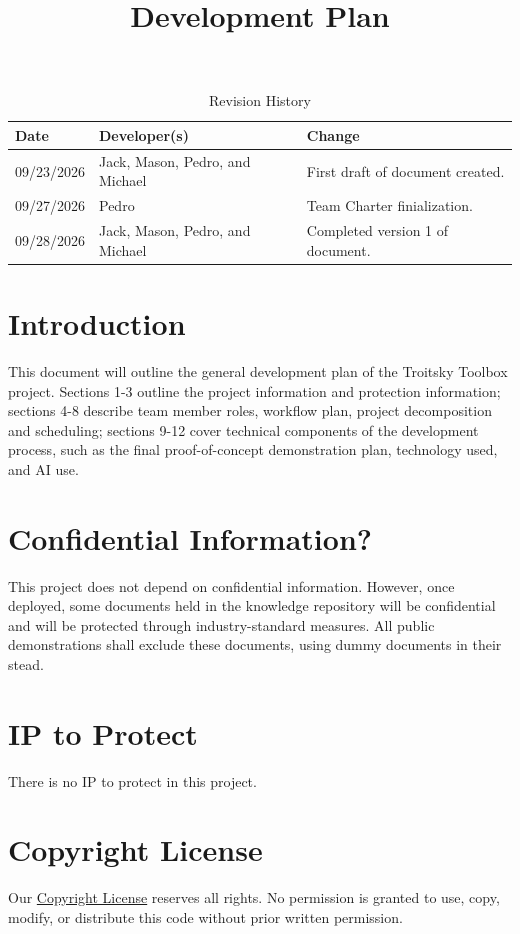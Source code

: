 \documentclass{article}
\title{Development Plan\\\progname}
\author{\authname}
\date{}
\begin{document}
\maketitle

\begin{table}[hp]
\caption{Revision History} \label{TblRevisionHistory}
\begin{tabularx}{\textwidth}{llX}
\toprule
\textbf{Date} & \textbf{Developer(s)} & \textbf{Change}\\
\midrule
09/23/2026 & Jack, Mason, Pedro, and Michael & First draft of document created.\\
09/27/2026 & Pedro & Team Charter finialization.\\
09/28/2026 & Jack, Mason, Pedro, and Michael & Completed version 1 of document.\\
\bottomrule
\end{tabularx}
\end{table}

\newpage{}
\section{Introduction}
This document will outline the general development plan of the Troitsky Toolbox project. Sections 1-3 outline the project information and protection information; sections 4-8 describe team member roles, workflow plan, project decomposition and scheduling; sections 9-12 cover technical components of the development process, such as the final proof-of-concept demonstration plan, technology used, and AI use.

\section{Confidential Information?}
This project does not depend on confidential information. However, once deployed, some documents held in the knowledge repository
will be confidential and will be protected through industry-standard measures. All public demonstrations shall exclude 
these documents, using dummy documents in their stead.

\section{IP to Protect}
There is no IP to protect in this project.

\section{Copyright License}
Our \href{https://github.com/JackEaston4/Troitsky-Toolbox/blob/main/LICENSE}{Copyright License} reserves all rights. No permission is granted to use, copy, modify, or distribute this code without prior written permission.
\end{document}
